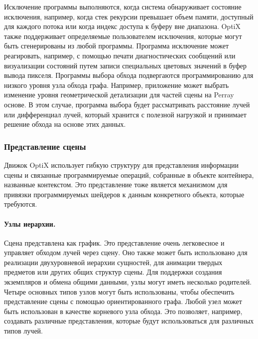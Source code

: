   Исключение программы выполняются, когда система обнаруживает состояние исключения, например, когда стек рекурсии превышает объем памяти, доступный для каждого потока или когда индекс доступа к буферу вне диапазона.
  OptiX также поддерживает определяемые пользователем исключения, которые могут быть сгенерированы из любой программы.
  Программа исключение может реагировать, например, с помощью печати диагностических сообщений или визуализации состояний путем записи специальных цветовых значений в буфер вывода пикселя.
  Программы выбора обхода подвергаются программированию для низкого уровня узла обхода графа.
  Например, приложение может выбрать изменение уровня геометрической детализации для частей сцены на Perray основе.
  В этом случае, программа выбора будет рассматривать расстояние лучей или дифференциал лучей, который хранится с полезной нагрузкой и принимает решение обхода на основе этих данных.
  
 \subsubsection{Представление сцены}
 
 Движок OptiX использует гибкую структуру для представления информации сцены и связанные программируемые операций, собранные в объекте контейнера, названные контекстом.
 Это представление тоже является механизмом для привязки программируемых шейдеров к данным конкретного объекта, которые требуются.

\paragraph{Узлы иерархии.}

Сцена представлена как график. Это представление очень легковесное и управляет обходом лучей через сцену. 
 Оно также может быть использовано для реализации двухуровневой иерархии сущностей, для анимации твердых предметов или других общих структур сцены.
 Для поддержки создания экземпляров и обмена общими данными, узлы могут иметь несколько родителей.
 Четыре основных типов узлов могут быть использованы, чтобы обеспечить представление сцены с помощью ориентированного графа.
 Любой узел может быть использован в качестве корневого узла обхода.
 Это позволяет, например, создавать различные представления, которые будут использоваться для различных типов лучей.
 
